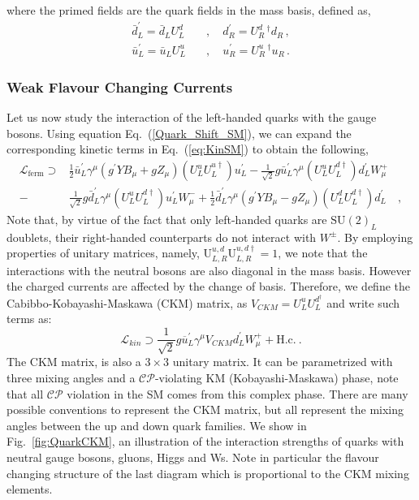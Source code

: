 \documentclass[10pt]{report}
\begin{document}
%
where the primed fields are the quark fields in the mass basis, defined as, 
\begin{equation}
\label{Quark_Shift_SM}
\begin{split}
\bar{d}^\prime_{L} = \bar{d}_{L} U^d_{L} \quad &, \quad d^\prime_{R} = U^d_{R} \,^\dagger d_{R} \, , \\
\bar{u}^\prime_{L} = \bar{u}_{L} U^u_{L} \quad &, \quad u^\prime_{R} = U^u_{R} \,^\dagger u_{R} \,. 
\end{split}  
\end{equation}

\subsubsection{Weak Flavour Changing Currents}

Let us now study the interaction of the left-handed quarks with the gauge bosons. Using equation Eq.~(\ref{Quark_Shift_SM}), we can expand the corresponding kinetic terms in Eq.~(\ref{eq:KinSM}) to obtain the following,   
%
\begin{equation}
\label{LagFermFCCCs}
\begin{aligned}
\mathcal{L}_{\text{ferm}} \supset & 
\frac{1}{2} \bar{u}^\prime_L \gamma^\mu \left( g^\prime Y B_\mu + g Z_\mu  \right) \left(U^u_L U^{u \dagger}_L \right) u^\prime_L - \frac{1}{\sqrt{2}} g \bar{u}^\prime_L \gamma^\mu \left( U^u_L U^{d \dagger}_L \right) d^\prime_L W^+_\mu \\    
- 
& \frac{1}{\sqrt{2}} g \bar{d}^\prime_L \gamma^\mu \left( U^u_L U^{d \dagger}_L \right) u^\prime_L W^-_\mu 
+ 
\frac{1}{2} \bar{d}^\prime_L \gamma^\mu \left( g^\prime Y B_\mu - g Z_\mu \right) \left( U^d_L U^{d \dagger}_L \right) d^\prime_L \quad , 
\end{aligned}
\end{equation}
%
Note that, by virtue of the fact that only left-handed quarks are $\mathrm{SU}(2)_L$ doublets, their right-handed counterparts do not interact with $W^\pm$.
%
By employing properties of unitary matrices, namely, $ \mathrm{U}^{u,d}_{L,R} \mathrm{U}^{u,d \dagger}_{L,R} = 1$, we note that the interactions with the neutral bosons are also diagonal in the mass basis. However the charged currents are affected by the change of basis. Therefore, we define the Cabibbo-Kobayashi-Maskawa (CKM) matrix, as $V_{CKM} = U^u_L U^{d ^\dagger }_L $ and write such terms as:
%
\begin{equation}
\mathcal{L}_{kin} \supset \frac{1}{\sqrt{2}} g \overline{u}^\prime_L \gamma^\mu V_{CKM} d_L^\prime W^+_\mu + \text{H.c.} \ . 
\end{equation}
%
The CKM matrix, is also a $3 \times 3$ unitary matrix. It can be parametrized with three mixing angles and a $\mathcal{CP}$-violating KM (Kobayashi-Maskawa) phase, note that all $\mathcal{CP}$ violation in the SM comes from this complex phase. There are many possible conventions to represent the CKM matrix, but all represent the mixing angles between the up and down quark families. We show in Fig.~\ref{fig:QuarkCKM}, an illustration of the interaction strengths of quarks with neutral gauge bosons, gluons, Higgs and Ws. Note in particular the flavour changing structure of the last diagram which is proportional to the CKM mixing elements. 
\end{document}
